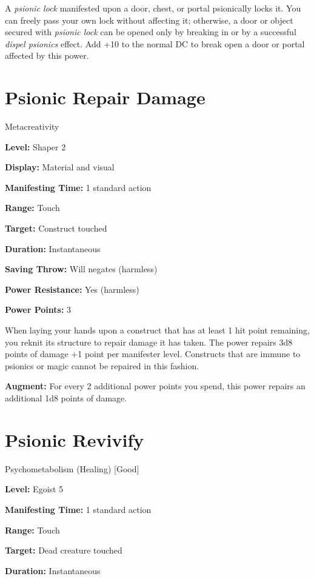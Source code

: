 \documentclass{article}
\begin{document}
A \textit{psionic lock }manifested upon a door, chest, or portal psionically locks 
it. You can freely pass your own lock without affecting it; otherwise, a door or 
object secured with \textit{psionic lock }can be opened only by breaking in or 
by a successful \textit{dispel psionics }effect. Add +10 to the normal DC to break 
open a door or portal affected by this power.

\vspace{12pt}
\section*{Psionic Repair Damage}

Metacreativity

\textbf{Level:} Shaper 2

\textbf{Display:} Material and visual

\textbf{Manifesting Time:} 1 standard action

\textbf{Range:} Touch

\textbf{Target:} Construct touched

\textbf{Duration:} Instantaneous

\textbf{Saving Throw:} Will negates (harmless)

\textbf{Power Resistance:} Yes (harmless)

\textbf{Power Points:} 3

When laying your hands upon a construct that has at least 1 hit point remaining, 
you reknit its structure to repair damage it has taken. The power repairs 3d8 points 
of damage +1 point per manifester level. Constructs that are immune to psionics 
or magic cannot be repaired in this fashion.

\textbf{Augment:} For every 2 additional power points you spend, this power repairs 
an additional 1d8 points of damage.

\vspace{12pt}
\section*{Psionic Revivify}

Psychometabolism (Healing) [Good]

\textbf{Level:} Egoist 5

\textbf{Manifesting Time:} 1 standard action

\textbf{Range:} Touch

\textbf{Target:} Dead creature touched

\textbf{Duration:} Instantaneous
\end{document}
